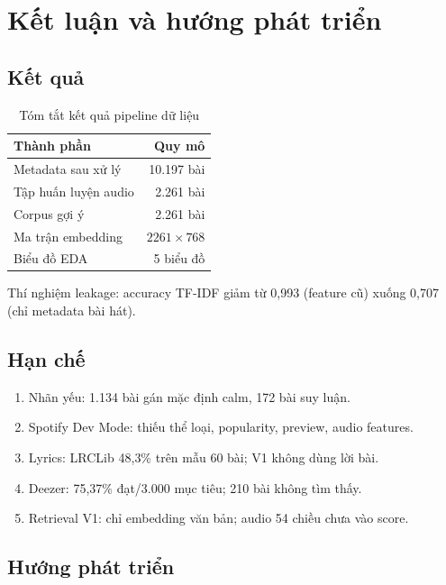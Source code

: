 \chapter*{Kết luận và hướng phát triển}

\section*{Kết quả}

\begin{table}[htbp]
  \centering
  \caption{Tóm tắt kết quả pipeline dữ liệu}
  \label{tab:ket-qua}
  \begin{tabularx}{\textwidth}{@{}L{4.5cm}r@{}}
    \toprule
    \textbf{Thành phần} & \textbf{Quy mô} \\
    \midrule
    Metadata sau xử lý & 10.197 bài \\
    Tập huấn luyện audio & 2.261 bài \\
    Corpus gợi ý & 2.261 bài \\
    Ma trận embedding & $2261 \times 768$ \\
    Biểu đồ EDA & 5 biểu đồ \\
    \bottomrule
  \end{tabularx}
\end{table}

Thí nghiệm leakage: accuracy TF-IDF giảm từ 0{,}993 (feature cũ) xuống 0{,}707 (chỉ metadata bài hát).

\section*{Hạn chế}

\begin{enumerate}[label=\arabic*.]
  \item Nhãn yếu: 1.134 bài gán mặc định calm, 172 bài suy luận.
  \item Spotify Dev Mode: thiếu thể loại, popularity, preview, audio features.
  \item Lyrics: LRCLib 48{,}3\% trên mẫu 60 bài; V1 không dùng lời bài.
  \item Deezer: 75{,}37\% đạt/3.000 mục tiêu; 210 bài không tìm thấy.
  \item Retrieval V1: chỉ embedding văn bản; audio 54 chiều chưa vào score.
\end{enumerate}

\section*{Hướng phát triển}

